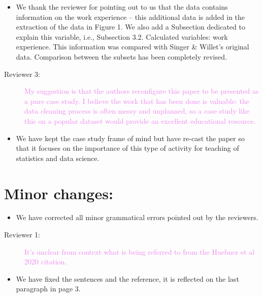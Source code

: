 \documentclass[12pt,a4paper,]{article}
\providecommand{\tightlist}{%
  \setlength{\itemsep}{0pt}\setlength{\parskip}{0pt}}
\begin{document}
\begin{itemize}
\tightlist
\item
  We thank the reviewer for pointing out to us that the data contains information on the work experience -- this additional data is added in the extraction of the data in Figure 1. We also add a Subsection dedicated to explain this variable, i.e., Subsection 3.2. Calculated variables: work experience. This information was compared with Singer \& Willet's original data. Comparison between the subsets has been completely revised.
\end{itemize}

\begin{description}
\item[Reviewer 3:] \textcolor{violet}{My suggestion is that the authors reconfigure this paper to be presented as a pure case study. I believe the work that has been done is valuable: the data cleaning process is often messy and unplanned, so a case study like this on a popular dataset would provide an excellent educational resource.}
\end{description}

\begin{itemize}
\tightlist
\item
  We have kept the case study frame of mind but have re-cast the paper so that it focuses on the importance of this type of activity for teaching of statistics and data science.
\end{itemize}

\section*{Minor changes:}

\begin{itemize}
\tightlist
\item
  We have corrected all minor grammatical errors pointed out by the reviewers.
\end{itemize}

\begin{description}
\item[Reviewer 1:]\textcolor{violet}{It's unclear from context what is being referred to from the Huebner et al 2020 citation.}
\end{description}

\begin{itemize}
\tightlist
\item
  We have fixed the sentences and the reference, it is reflected on the last paragraph in page 3.
\end{itemize}
\end{document}
